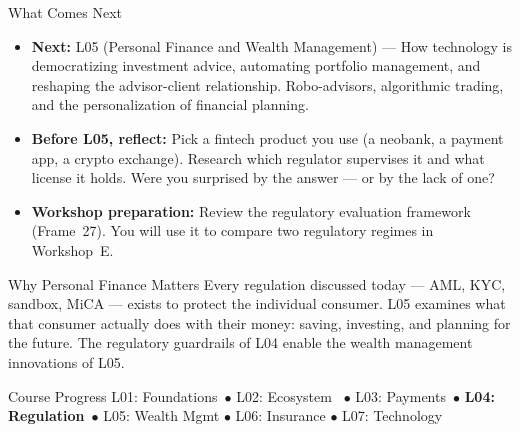 \begin{frame}{What Comes Next}
  \begin{itemize}
    \item \textbf{Next:} L05 (Personal Finance and Wealth Management) ---
          How technology is democratizing investment advice, automating
          portfolio management, and reshaping the advisor-client relationship.
          Robo-advisors, algorithmic trading, and the personalization of
          financial planning.
    \item \textbf{Before L05, reflect:} Pick a fintech product you use (a
          neobank, a payment app, a crypto exchange). Research which regulator
          supervises it and what license it holds. Were you surprised by the
          answer --- or by the lack of one?
    \item \textbf{Workshop preparation:} Review the regulatory evaluation
          framework (Frame~27). You will use it to compare two regulatory
          regimes in Workshop~E.
  \end{itemize}

  \vspace{0.8em}
  \begin{block}{Why Personal Finance Matters}
    Every regulation discussed today --- AML, KYC, sandbox, MiCA ---
    \textcolor{mlpurple}{exists to protect the individual consumer}. L05
    examines what that consumer actually does with their money: saving,
    investing, and planning for the future. The regulatory guardrails of L04
    enable the wealth management innovations of L05.
  \end{block}

  \vspace{0.5em}
  \begin{exampleblock}{Course Progress}
    \small
    L01: Foundations~\checkmark \(\bullet\) L02: Ecosystem~\checkmark
    \(\bullet\) L03: Payments~\checkmark \(\bullet\)
    \textbf{L04: Regulation}~\checkmark \(\bullet\)
    L05: Wealth Mgmt \(\bullet\) L06: Insurance \(\bullet\)
    L07: Technology
  \end{exampleblock}
\end{frame}


